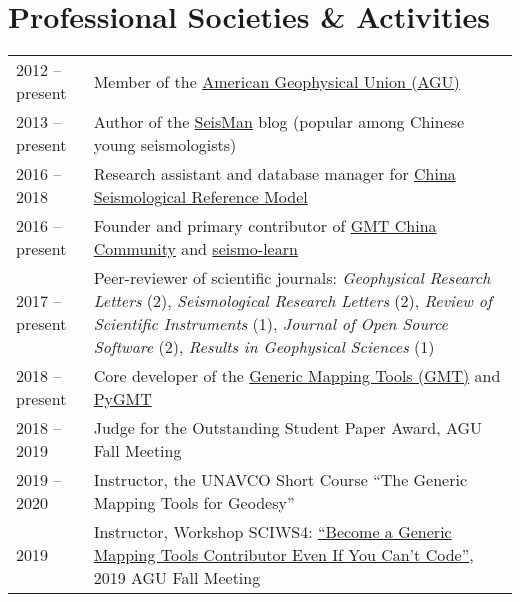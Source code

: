 \section*{Professional Societies \& Activities}

\newcommand{\tabitem}{~~\llap{\textbullet}~~}

\begin{tabular}{p{} p{}}
2012 -- present & Member of the \href{https://sites.agu.org/}{American Geophysical Union (AGU)} \\
2013 -- present & Author of the \href{https://blog.seisman.info}{SeisMan} blog (popular among Chinese young seismologists) \\
2016 -- 2018    & Research assistant and database manager for \href{http://chinageorefmodel.org/}{China Seismological Reference Model} \\
2016 -- present & Founder and primary contributor of \href{http://gmt-china.org/}{GMT China Community} and \href{https://seismo-learn.org/}{seismo-learn} \\
2017 -- present & Peer-reviewer of scientific journals:
                  \textit{Geophysical Research Letters} (2),
                  \textit{Seismological Research Letters} (2),
                  \textit{Review of Scientific Instruments} (1),
                  \textit{Journal of Open Source Software} (2),
                  \textit{Results in Geophysical Sciences} (1) \\
2018 -- present & Core developer of the \href{https://github.com/GenericMappingTools/gmt}{Generic Mapping Tools (GMT)} and \href{https://github.com/GenericMappingTools/pygmt}{PyGMT} \\
2018 -- 2019 & Judge for the Outstanding Student Paper Award, AGU Fall Meeting \\
2019 -- 2020 & Instructor, the UNAVCO Short Course ``The Generic Mapping Tools for Geodesy'' \\
2019 & Instructor, Workshop SCIWS4: \href{https://www.agu.org/Events/SCIWS4-Generic-Mapping-Tools}{``Become a Generic Mapping Tools Contributor Even If You Can't Code''}, 2019 AGU Fall Meeting \\
\end{tabular}
